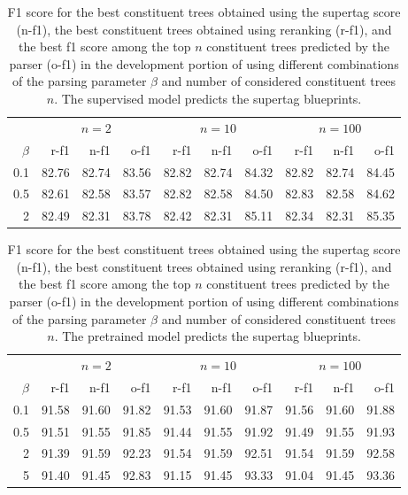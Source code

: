 \documentclass[../../document.tex]{subfiles}
\begin{document}
    \begin{table}
        \caption{\label{tbl:grid:reranking:supervised}
        F1 score for the best constituent trees obtained using the supertag score (n-f1), the best constituent trees obtained using reranking (r-f1), and the best f1 score among the top $n$ constituent trees predicted by the parser (o-f1) in the development portion of \negra{} using different combinations of the parsing parameter $\beta$ and number of considered constituent trees $n$. The supervised model predicts the supertag blueprints.
        }
        \centering
        \vspace{.2cm}
        \begin{tabular}{r|rrr|rrr|rrr}
            \toprule
       & \multicolumn{3}{c|}{$n = 2$} & \multicolumn{3}{c|}{$n = 10$}& \multicolumn{3}{c}{$n = 100$}\\
 \(\beta\) & r-f1 & n-f1 & o-f1  & r-f1 & n-f1 & o-f1 & r-f1 & n-f1 & o-f1   \\
\hline 
0.1 & 82.76 & 82.74 & 83.56 & 82.82 & 82.74 & 84.32 & 82.82 & 82.74 & 84.45 \\
0.5 & 82.61 & 82.58 & 83.57 & 82.82 & 82.58 & 84.50 & 82.83 & 82.58 & 84.62 \\
  2 & 82.49 & 82.31 & 83.78 & 82.42 & 82.31 & 85.11 & 82.34 & 82.31 & 85.35 \\
\bottomrule
        \end{tabular}
    \end{table}

    \begin{table}
        \caption{\label{tbl:grid:reranking:pretrained}
        F1 score for the best constituent trees obtained using the supertag score (n-f1), the best constituent trees obtained using reranking (r-f1), and the best f1 score among the top $n$ constituent trees predicted by the parser (o-f1) in the development portion of \negra{} using different combinations of the parsing parameter $\beta$ and number of considered constituent trees $n$. The pretrained model predicts the supertag blueprints.
        }
        \centering
        \vspace{.2cm}
        \begin{tabular}{r|rrr|rrr|rrr}
            \toprule
       & \multicolumn{3}{c|}{$n = 2$} & \multicolumn{3}{c|}{$n = 10$}& \multicolumn{3}{c}{$n = 100$}\\
 \(\beta\) & r-f1 & n-f1 & o-f1  & r-f1 & n-f1 & o-f1 & r-f1 & n-f1 & o-f1   \\
\hline 
0.1 & 91.58 & 91.60 & 91.82 & 91.53 & 91.60 & 91.87 & 91.56 & 91.60 & 91.88\\
0.5 & 91.51 & 91.55 & 91.85 & 91.44 & 91.55 & 91.92 & 91.49 & 91.55 & 91.93 \\
  2 & 91.39 & 91.59 & 92.23 & 91.54 & 91.59 & 92.51 & 91.54 & 91.59 & 92.58 \\
  5 & 91.40 & 91.45 & 92.83 & 91.15 & 91.45 & 93.33 & 91.04 & 91.45 & 93.36 \\
\bottomrule
        \end{tabular}
    \end{table}
\end{document}
